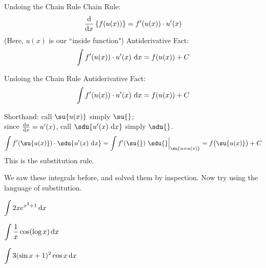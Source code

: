 \begin{frame}[t]{Undoing the Chain Rule}
Chain Rule:
\[\frac{\text{d}}{\text{d}x}\left\{ f(u(x))\right\} = f'(u(x))\cdot u'(x) \]
(Here, $u(x)$ is our ``inside function")\vfill
Antiderivative Fact:
\[\int f'(u(x))\cdot u'(x)\ \text{d} x=f(u(x))+C \]
\end{frame}
\begin{frame}{Undoing the Chain Rule}
Antiderivative Fact:
\[\int f'(u(x))\cdot u'(x)\ \text{d} x=f(u(x))+C \]\vfill\pause

Shorthand: call $\su{u(x)}$ simply $\su{}$;\\
since $\frac{\text{d}u}{\text{d}x}=u'(x)$, call $\sdu{u'(x)\ \dee x}$ simply $\sdu{}$.\pause\vfill
\[\int f'(\su{u(x)})\cdot \sdu{u'(x)\ \dee x} = \int f'(\su{})\ \sdu{}\Big|_{\su{u=u(x)}}=f\big(\su{u(x)}\big)+C\]\vfill
This is the \alert{substitution rule}.
\end{frame}
\begin{frame}[t]
We saw these integrals before, and solved them by inspection. Now try using the language of substitution.
\vfill

$\displaystyle \int 2xe^{x^2+1}\, \text{d} x$

 \vfill
 
$\displaystyle\int \frac1x \cos(\log x)\, \text{d} x $ 

\vfill
$\displaystyle\int 3(\sin x+1)^2 \cos x\, \text{d} x $

  \vfill

\end{frame}

